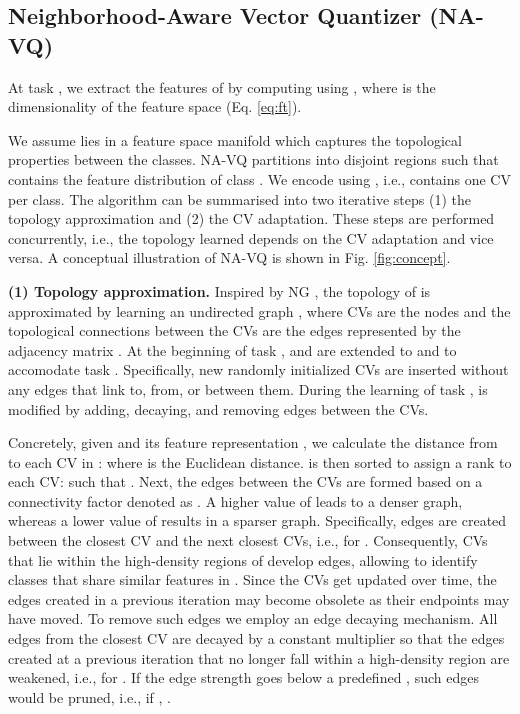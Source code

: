 \documentclass[10pt,twocolumn,letterpaper]{article}
\begin{document}
\subsection{Neighborhood-Aware Vector Quantizer (NA-VQ)}\label{sec:navq}



At task , we extract the features of  by computing  using , where  is the dimensionality of the feature space (Eq. \ref{eq:ft}). 


We assume  lies in a feature space manifold  which captures the topological properties between the classes. NA-VQ partitions  into disjoint regions such that  contains the feature distribution of class . We encode  using , i.e.,  contains one CV per class.
 The algorithm can be summarised into two iterative steps (1) the topology approximation and (2) the CV adaptation. 
These steps are performed concurrently, i.e., the topology learned depends on the CV adaptation and vice versa. A conceptual illustration of NA-VQ is shown in Fig. \ref{fig:concept}.

\textbf{(1) Topology approximation.}
Inspired by NG \cite{ThomasMartinetzandKlausSchulten1991ATopologies}, the topology of  is approximated by learning an undirected graph , where CVs are the nodes and the topological connections between the CVs are the edges represented by the adjacency matrix . 
At the beginning of task ,  and  are extended to  and  to accomodate task . Specifically,  new randomly initialized CVs are inserted without any edges that link to, from, or between them.
 During the learning of task ,  is modified by adding, decaying, and removing edges between the CVs. 



Concretely, given  and its feature representation , we calculate the distance from  to each CV in :
 where  is the Euclidean distance. 
 is then sorted to assign a rank to each CV:
 such that . Next, the edges between the CVs are formed based on a connectivity factor denoted as . A higher value of  leads to a denser graph, whereas a lower value of  results in a sparser graph. Specifically, edges are created between the closest CV and the next  closest CVs, i.e.,  for . 
Consequently, CVs that lie within the high-density regions of   develop edges, allowing to identify classes that share similar features in . Since the CVs get updated over time, the edges created in a previous iteration may become obsolete as their endpoints may have moved. To remove such edges we employ an edge decaying mechanism. All edges from the closest CV are decayed by a constant multiplier  so that the edges created at a previous iteration that no longer fall within a high-density region are weakened, i.e.,  for .
If the edge strength goes below a predefined , such edges would be pruned, i.e., if , .
\end{document}
